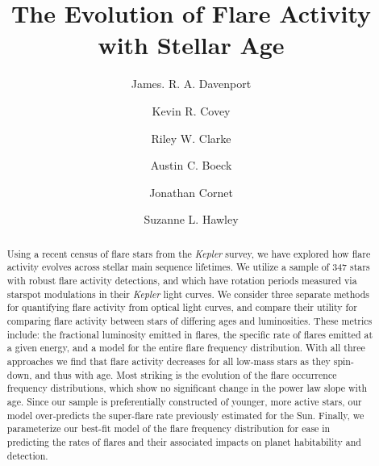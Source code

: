 \documentclass[preprint2]{aastex62}
\newcommand{\Kepler}{\textsl{Kepler}\xspace}
\begin{document}
\title{The Evolution of Flare Activity with Stellar Age} %




\author{James. R. A. Davenport}

\author{Kevin R. Covey}

\author{Riley W. Clarke}

\author{Austin C. Boeck}

\author{Jonathan Cornet}

\author{Suzanne L. Hawley}

 

\begin{abstract}
Using a recent census of flare stars from the \Kepler survey, we have explored how flare activity evolves across stellar main sequence lifetimes. We utilize a sample of 347 stars with robust flare activity detections, and which have rotation periods measured via starspot modulations in their \Kepler light curves. 
We consider three separate methods for quantifying flare activity from optical light curves, and compare their utility for comparing flare activity between stars of differing ages and luminosities.
These metrics include: the fractional luminosity emitted in flares, the specific rate of flares emitted at a given energy, and a model for the entire flare frequency distribution. With all three approaches we find that flare activity decreases for all low-mass stars as they spin-down, and thus with age. 
Most striking is the evolution of the flare occurrence frequency distributions, which show no significant change in the power law slope with age. Since our sample is preferentially constructed of younger, more active stars, our model over-predicts the super-flare rate previously estimated for the Sun. 
Finally, we parameterize our best-fit model of the flare frequency distribution for ease in predicting the rates of flares and their associated impacts on planet habitability and detection. 
 \end{abstract}
\end{document}
